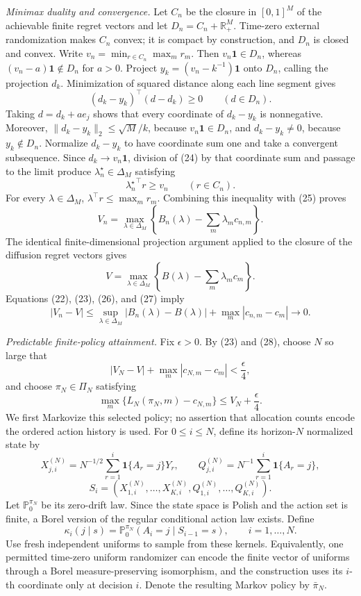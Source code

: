 \emph{Minimax duality and convergence.}  Let \(C_n\) be the closure in \([0,1]^M\) of the achievable finite regret vectors and let \(D_n=C_n+\mathbb R_+^M\).  Time-zero external randomization makes \(C_n\) convex; it is compact by construction, and \(D_n\) is closed and convex.  Write \(v_n=\min_{r\in C_n}\max_mr_m\).  Then \(v_n\mathbf 1\in D_n\), whereas \((v_n-a)\mathbf 1\notin D_n\) for \(a>0\).  Project \(y_k=(v_n-k^{-1})\mathbf 1\) onto \(D_n\), calling the projection \(d_k\).  Minimization of squared distance along each line segment gives
\[
 (d_k-y_k)^\top(d-d_k)\geq0\qquad(d\in D_n).                    \tag{24}
\]
Taking \(d=d_k+ae_j\) shows that every coordinate of \(d_k-y_k\) is nonnegative.  Moreover, \(\|d_k-y_k\|_2\leq\sqrt M/k\), because \(v_n\mathbf1\in D_n\), and \(d_k-y_k\neq0\), because \(y_k\notin D_n\).  Normalize \(d_k-y_k\) to have coordinate sum one and take a convergent subsequence.  Since \(d_k\to v_n\mathbf1\), division of (24) by that coordinate sum and passage to the limit produce \(\lambda_n^\star\in\Delta_M\) satisfying
\[
 {\lambda_n^\star}^{\!\top}r\geq v_n\qquad(r\in C_n).          \tag{25}
\]
For every \(\lambda\in\Delta_M\), \(\lambda^\top r\leq\max_mr_m\).  Combining this inequality with (25) proves
\[
 V_n=\max_{\lambda\in\Delta_M}
 \left\{B_n(\lambda)-\sum_m\lambda_mc_{n,m}\right\}.           \tag{26}
\]
The identical finite-dimensional projection argument applied to the closure of the diffusion regret vectors gives
\[
 V=\max_{\lambda\in\Delta_M}
 \left\{B(\lambda)-\sum_m\lambda_mc_m\right\}.                 \tag{27}
\]
Equations (22), (23), (26), and (27) imply
\[
 |V_n-V|\leq
 \sup_{\lambda\in\Delta_M}|B_n(\lambda)-B(\lambda)|
 +\max_m|c_{n,m}-c_m|\longrightarrow0.                           \tag{28}
\]

\emph{Predictable finite-policy attainment.}  Fix \(\epsilon>0\).  By (23) and (28), choose \(N\) so large that
\[
 |V_N-V|+\max_m|c_{N,m}-c_m|<\frac\epsilon4,                    \tag{29}
\]
and choose \(\pi_N\in\Pi_N\) satisfying
\[
 \max_m\{L_N(\pi_N,m)-c_{N,m}\}\leq V_N+\frac\epsilon4.       \tag{30}
\]
We first Markovize this selected policy; no assertion that allocation counts encode the ordered action history is used.  For \(0\leq i\leq N\), define its horizon-\(N\) normalized state by
\[
 X_{j,i}^{(N)}=N^{-1/2}\sum_{r=1}^i\mathbf 1\{A_r=j\}Y_r,
 \qquad
 Q_{j,i}^{(N)}=N^{-1}\sum_{r=1}^i\mathbf 1\{A_r=j\},
\]
\[
 S_i=(X_{1,i}^{(N)},\ldots,X_{K,i}^{(N)},Q_{1,i}^{(N)},\ldots,Q_{K,i}^{(N)}).
\]
Let \(\mathbb P_0^{\pi_N}\) be its zero-drift law.  Since the state space is Polish and the action set is finite, a Borel version of the regular conditional action law exists.  Define
\[
 \kappa_i(j\mid s)
 =\mathbb P_0^{\pi_N}(A_i=j\mid S_{i-1}=s),
 \qquad i=1,\ldots,N.                                           \tag{31}
\]
Use fresh independent uniforms to sample from these kernels.  Equivalently, one permitted time-zero uniform randomizer can encode the finite vector of uniforms through a Borel measure-preserving isomorphism, and the construction uses its \(i\)-th coordinate only at decision \(i\).  Denote the resulting Markov policy by \(\bar\pi_N\).

